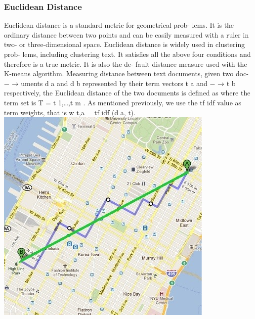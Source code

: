 \documentclass{VUMIFInfKursinis}
\begin{document}
		\subsubsection{Euclidean Distance}
			Euclidean distance is a standard metric for geometrical prob- lems. It is the ordinary distance between two points and can be easily measured with a ruler in two- or three-dimensional space. Euclidean distance is widely used in clustering prob- lems, including clustering text. It satisfies all the above four conditions and therefore is a true metric. It is also the de- fault distance measure used with the K-means algorithm.
			Measuring distance between text documents, given two doc- − → uments d a and d b represented by their term vectors t a and − → t b respectively, the Euclidean distance of the two documents is defined as
			where the term set is T = {t 1,\ldots,t m }. As mentioned previously, we use the tf idf value as term weights, that is w t,a = tf idf (d a, t).
			\includegraphics{MvsE}
\end{document}
